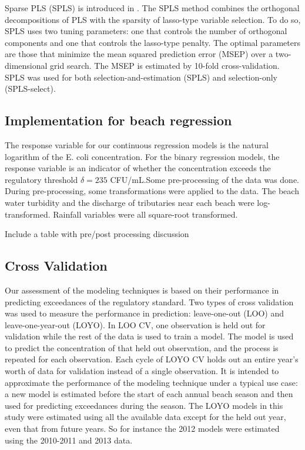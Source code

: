 \documentclass[english]{article}\usepackage[]{graphicx}\usepackage[]{color}
\numberwithin{equation}{section}
\numberwithin{figure}{section}
\renewcommand\[{\begin{equation}}
\renewcommand\]{\end{equation}}
\begin{document}
Sparse PLS (SPLS) is introduced in \citet{Chun-Keles-2007}. The SPLS
method combines the orthogonal decompositions of PLS with the sparsity
of lasso-type variable selection. To do so, SPLS uses two tuning parameters:
one that controls the number of orthogonal components and one that
controls the lasso-type penalty. The optimal parameters are those
that minimize the mean squared prediction error (MSEP) over a two-dimensional
grid search. The MSEP is estimated by 10-fold cross-validation. SPLS
was used for both selection-and-estimation (SPLS) and selection-only
(SPLS-select).


\subsection{Implementation for beach regression}

The response variable for our continuous regression models is the
natural logarithm of the E. coli concentration. For the binary regression
models, the response variable is an indicator of whether the concentration
exceeds the regulatory threshold $\delta=235$ CFU/mL.Some pre-processing
of the data was done. During pre-processing, some transformations
were applied to the data. The beach water turbidity and the discharge
of tributaries near each beach were log-transformed. Rainfall variables
were all square-root transformed.

Include a table with pre/post processing discussion


\subsection{Cross Validation}

Our assessment of the modeling techniques is based on their performance
in predicting exceedances of the regulatory standard. Two types of
cross validation was used to measure the performance in prediction:
leave-one-out (LOO) and leave-one-year-out (LOYO). In LOO CV, one
observation is held out for validation while the rest of the data
is used to train a model. The model is used to predict the concentration
of that held out observation, and the process is repeated for each
observation. Each cycle of LOYO CV holds out an entire year's worth
of data for validation instead of a single observation. It is intended
to approximate the performance of the modeling technique under a typical
use case: a new model is estimated before the start of each annual
beach season and then used for predicting exceedances during the season.
The LOYO models in this study were estimated using all the available
data except for the held out year, even that from future years. So
for instance the 2012 models were estimated using the 2010-2011 and
2013 data.
\end{document}
